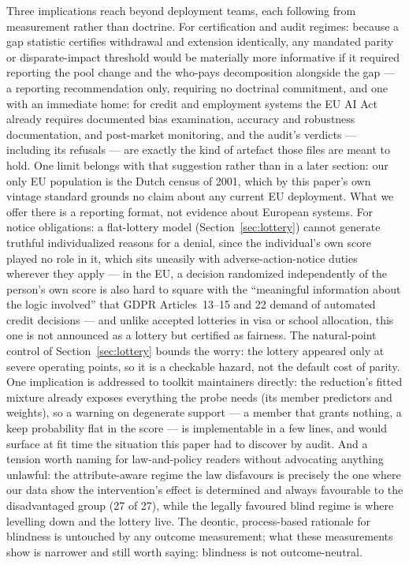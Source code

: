 \documentclass[conference]{IEEEtran}
\begin{document}
Three implications reach beyond deployment teams, each following from measurement rather
than doctrine. For certification and audit regimes: because a gap statistic certifies
withdrawal and extension identically, any mandated parity or disparate-impact threshold
would be materially more informative if it required reporting the pool change and the
who-pays decomposition alongside the gap --- a reporting recommendation only, requiring
no doctrinal commitment, and one with an immediate home: for credit and employment
systems the EU AI Act already requires documented bias examination, accuracy and
robustness documentation, and post-market monitoring, and the audit's verdicts ---
including its refusals --- are exactly the kind of artefact those files are meant to
hold. One limit belongs with that suggestion rather than in a later section: our only
EU population is the Dutch census of 2001, which by this paper's own vintage standard
grounds no claim about any current EU deployment. What we offer there is a reporting
format, not evidence about European systems. For notice obligations: a flat-lottery model
(Section~\ref{sec:lottery}) cannot generate truthful individualized reasons for a denial,
since the individual's own score played no role in it, which sits uneasily with
adverse-action-notice duties wherever they apply --- in the EU, a decision randomized
independently of the person's own score is also hard to square with the ``meaningful
information about the logic involved'' that GDPR Articles~13--15 and 22 demand of
automated credit decisions --- and unlike accepted lotteries in visa
or school allocation, this one is not announced as a lottery but certified as fairness.
The natural-point control of Section~\ref{sec:lottery} bounds the worry: the lottery
appeared only at severe operating points, so it is a checkable hazard, not the default
cost of parity. One implication is addressed to toolkit maintainers directly: the
reduction's fitted mixture already exposes everything the probe needs (its member
predictors and weights), so a warning on degenerate support --- a member that grants
nothing, a keep probability flat in the score --- is implementable in a few lines, and
would surface at fit time the situation this paper had to discover by audit.
And a tension worth naming for law-and-policy readers without advocating anything unlawful:
the attribute-aware regime the law disfavours is precisely the one where our data show the
intervention's effect is determined and always favourable to the disadvantaged group
(27 of 27), while the legally favoured blind regime is where levelling down and the
lottery live. The deontic, process-based rationale for blindness is untouched by any
outcome measurement; what these measurements show is narrower and still worth saying:
blindness is not outcome-neutral.
\end{document}
